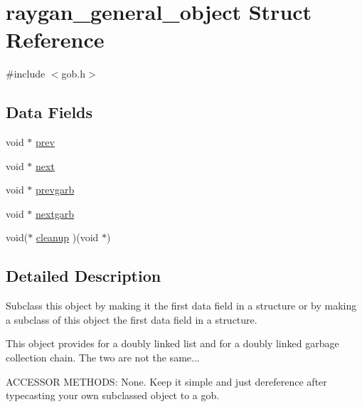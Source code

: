 \hypertarget{structraygan__general__object}{\section{raygan\+\_\+general\+\_\+object Struct Reference}
\label{structraygan__general__object}
}


{\ttfamily \#include $<$gob.\+h$>$}

\subsection*{Data Fields}
\begin{DoxyCompactItemize}
\item 
void $\ast$ \hyperlink{structraygan__general__object_aa8f4b6b7ad65fa40342f28c9ce30cb6b}{prev}
\item 
void $\ast$ \hyperlink{structraygan__general__object_abca7656e199e85edfa1304150cb2d7d9}{next}
\item 
void $\ast$ \hyperlink{structraygan__general__object_a571269e726fb52755234c73b02ad9ea8}{prevgarb}
\item 
void $\ast$ \hyperlink{structraygan__general__object_a97be0f07a3b6afe858c5c6ba8f3e1987}{nextgarb}
\item 
void($\ast$ \hyperlink{structraygan__general__object_aa4c5799d4485b20618b80d670c55b598}{cleanup} )(void $\ast$)
\end{DoxyCompactItemize}


\subsection{Detailed Description}
Subclass this object by making it the first data field in a structure or by making a subclass of this object the first data field in a structure.

This object provides for a doubly linked list and for a doubly linked garbage collection chain. The two are not the same...

A\+C\+C\+E\+S\+S\+O\+R M\+E\+T\+H\+O\+D\+S\+: None. Keep it simple and just dereference after typecasting your own subclassed object to a gob. 

